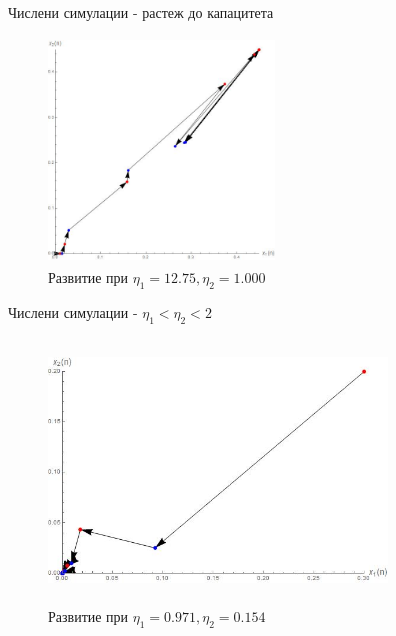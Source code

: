 \begin{frame}[t]{Числени симулации - растеж до капацитета}

\begin{center}
\begin{figure}[htp]
\includegraphics[width=6cm,height=6cm]
{migrationSimulation3}
\caption{Развитие при $\eta_{1}=12.75, \eta_{2}=1.000$}
\end{figure}
\end{center}

\end{frame}

\begin{frame}[t]{Числени симулации - $\eta_{1} < \eta_{2} < 2$}

\begin{center}
\begin{figure}[htp]
\includegraphics[width=9cm,height=7cm]
{migrationSimulation4}
\caption{Развитие при $\eta_{1}=0.971, \eta_{2}=0.154$}
\end{figure}
\end{center}

\end{frame}